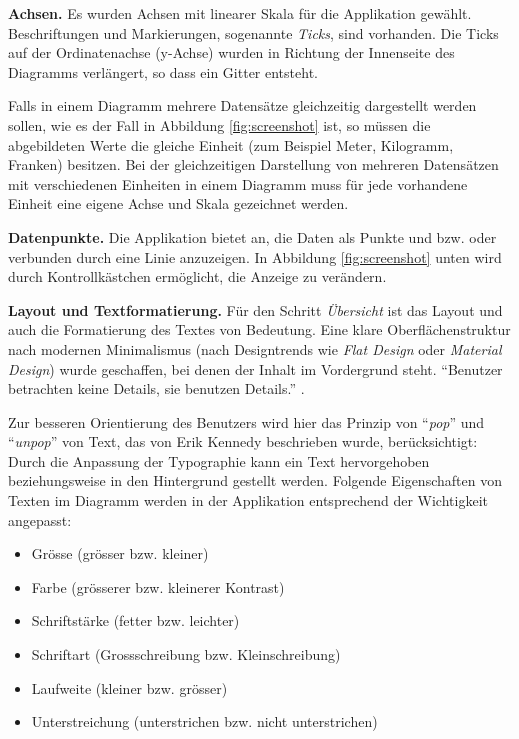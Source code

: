 \textbf{Achsen.} Es wurden Achsen mit linearer Skala für die Applikation gewählt. Beschriftungen und Markierungen, sogenannte \textit{Ticks}, sind vorhanden. Die Ticks auf der Ordinatenachse (y-Achse) wurden in Richtung der Innenseite des Diagramms verlängert, so dass ein Gitter entsteht.

Falls in einem Diagramm mehrere Datensätze gleichzeitig dargestellt werden sollen, wie es der Fall in Abbildung \ref{fig:screenshot} ist, so müssen die abgebildeten Werte die gleiche Einheit (zum Beispiel Meter, Kilogramm, Franken) besitzen. Bei der gleichzeitigen Darstellung von mehreren Datensätzen mit verschiedenen Einheiten in einem Diagramm muss für jede vorhandene Einheit eine eigene Achse und Skala gezeichnet werden.

\textbf{Datenpunkte.} Die Applikation bietet an, die Daten als Punkte und bzw. oder verbunden durch eine Linie anzuzeigen. In Abbildung \ref{fig:screenshot} unten wird durch Kontrollkästchen ermöglicht, die Anzeige zu verändern.

\textbf{Layout und Textformatierung.} Für den Schritt \textit{Übersicht} ist das Layout und auch die Formatierung des Textes von Bedeutung. Eine klare Oberflächenstruktur nach modernen Minimalismus (nach Designtrends wie \textit{Flat Design} oder \textit{Material Design}) wurde geschaffen, bei denen der Inhalt im Vordergrund steht. "`Benutzer betrachten keine Details, sie benutzen Details."' \cite{minimalism}.

Zur besseren Orientierung des Benutzers wird hier das Prinzip von "`\textit{pop}"' und "`\textit{unpop}"' von Text, das von Erik Kennedy \cite{pop} beschrieben wurde, berücksichtigt: Durch die Anpassung der Typographie kann ein Text hervorgehoben beziehungsweise in den Hintergrund gestellt werden. Folgende Eigenschaften von Texten im Diagramm werden in der Applikation entsprechend der Wichtigkeit angepasst:

\begin{itemize}
	\item Grösse (grösser bzw. kleiner)
	\item Farbe (grösserer bzw. kleinerer Kontrast)
	\item Schriftstärke (fetter bzw. leichter)
	\item Schriftart (Grossschreibung bzw. Kleinschreibung)
	\item Laufweite (kleiner bzw. grösser)
	\item Unterstreichung (unterstrichen bzw. nicht unterstrichen)
\end{itemize}


